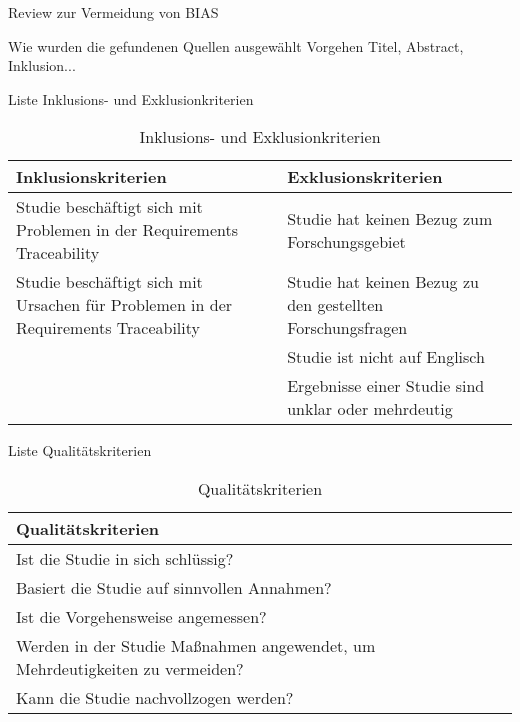     
Review zur Vermeidung von BIAS

Wie wurden die gefundenen Quellen ausgewählt
    Vorgehen Titel, Abstract, Inklusion...
    
Liste Inklusions- und Exklusionkriterien

\begin{table}[!ht]
\renewcommand{\arraystretch}{1.3}
\centering
\begin{threeparttable}
\begin{tabularx}{\columnwidth}{@{}XX@{}}
\toprule
Inklusionskriterien & Exklusionskriterien \\ \midrule
Studie beschäftigt sich mit Problemen in der Requirements Traceability & Studie hat keinen Bezug zum Forschungsgebiet \\
Studie beschäftigt sich mit Ursachen für Problemen in der Requirements Traceability & Studie hat keinen Bezug zu den gestellten Forschungsfragen \\
& Studie ist nicht auf Englisch \\
& Ergebnisse einer Studie sind unklar oder mehrdeutig \\
\bottomrule
\end{tabularx}
\medskip
\end{threeparttable}
\caption{Inklusions- und Exklusionkriterien}
\label{tab:inklusions_exklusionkriterien}
\end{table}

Liste Qualitätskriterien

\begin{table}[!ht]
\renewcommand{\arraystretch}{1.3}
\centering
\begin{threeparttable}
\begin{tabularx}{\columnwidth}{@{}XX@{}}
\toprule
Qualitätskriterien \\ \midrule
Ist die Studie in sich schlüssig? \\
Basiert die Studie auf sinnvollen Annahmen? \\
Ist die Vorgehensweise angemessen? \\
Werden in der Studie Maßnahmen angewendet, um Mehrdeutigkeiten zu vermeiden? \\
Kann die Studie nachvollzogen werden? \\
\bottomrule
\end{tabularx}
\medskip
\end{threeparttable}
\caption{Qualitätskriterien}
\label{tab:qualitaetskriterien}
\end{table}

